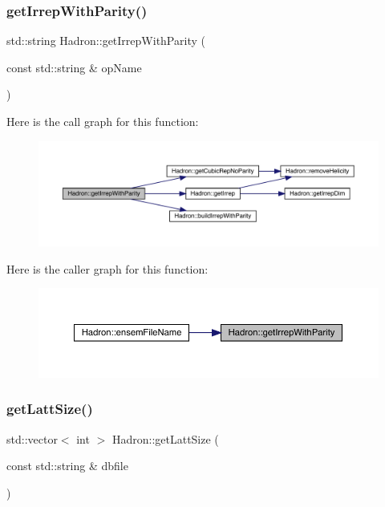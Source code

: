 \subsubsection{\texorpdfstring{getIrrepWithParity()}{getIrrepWithParity()}}
{\footnotesize\ttfamily std\+::string Hadron\+::get\+Irrep\+With\+Parity (\begin{DoxyParamCaption}\item[{const std\+::string \&}]{op\+Name }\end{DoxyParamCaption})}

Here is the call graph for this function\+:\nopagebreak
\begin{figure}[H]
\begin{center}
\leavevmode
\includegraphics[width=350pt]{d1/daf/namespaceHadron_a0f40c5d7e590d17294e0a27e231c0a4b_cgraph}
\end{center}
\end{figure}
Here is the caller graph for this function\+:\nopagebreak
\begin{figure}[H]
\begin{center}
\leavevmode
\includegraphics[width=350pt]{d1/daf/namespaceHadron_a0f40c5d7e590d17294e0a27e231c0a4b_icgraph}
\end{center}
\end{figure}
\mbox{\label{namespaceHadron_aa639c858514f322eb7ee4c074924746a}} 
\subsubsection{\texorpdfstring{getLattSize()}{getLattSize()}}
{\footnotesize\ttfamily std\+::vector$<$ int $>$ Hadron\+::get\+Latt\+Size (\begin{DoxyParamCaption}\item[{const std\+::string \&}]{dbfile }\end{DoxyParamCaption})}



